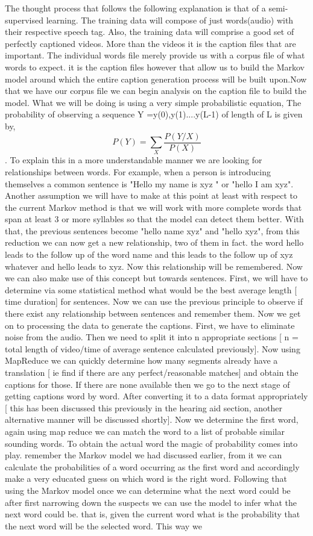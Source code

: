 \documentclass[sigconf]{acmart}
\begin{document}
The thought process that follows the following explanation is that of a semi-supervised learning. The training data will compose of just words(audio) with their respective speech tag. Also, the training data will comprise a good set of perfectly captioned videos. More than the videos it is the caption files that are important. The individual words file merely provide us with a corpus file of what words to expect. it is the caption files however that allow us to build the Markov model around which the entire caption generation process will be built upon.Now that we have our corpus file we can begin analysis on the caption file to build the model. What we will be doing is using a very simple probabilistic equation, The probability of observing a sequence Y =y(0),y(1)....y(L-1) of length of L is given by, \[ P(Y) = \sum_{X}^{} \frac{P(Y/X)}{P(X)} \] . To explain this in a more understandable manner we are looking for relationships between words. For example, when a person is introducing themselves a common sentence is "Hello my name is xyz " or "hello I am xyz". Another assumption we will have to make at this point at least with respect to the current Markov method is that we will work with more complete words that span at least 3 or more syllables so that the model can detect them better. With that, the previous sentences become "hello name xyz" and "hello xyz", from this reduction we can now get a new relationship, two of them in fact. the word hello leads to the follow up of the word name and this leads to the follow up of xyz whatever and hello leads to xyz. Now this relationship will be remembered. Now we can also make use of this concept but towards sentences. First, we will have to determine via some statistical method what would be the best average length [ time duration] for sentences. Now we can use the previous principle to observe if there exist any relationship between sentences and remember them. Now we get on to processing the data to generate the captions. First, we have to eliminate noise from the audio. Then we need to split it into n appropriate sections [ n = total length of video/time of average sentence calculated previously].  Now using MapReduce we can quickly determine how many segments already have a translation [ ie find if there are any perfect/reasonable matches] and obtain the captions for those. If there are none available then we go to the next stage of getting captions word by word. After converting it to a data format appropriately [ this has been discussed this previously in the hearing aid section, another alternative manner will be discussed shortly]. Now we determine the first word, again using map reduce we can match the word to a list of probable similar sounding words. To obtain the actual word the magic of probability comes into play. remember the Markov model we had discussed earlier, from it we can calculate the probabilities of a word occurring as the first word and accordingly make a very educated guess on which word is the right word. Following that using the Markov model once we can determine what the next word could be after first narrowing down the suspects we can use the model to infer what the next word could be. that is, given the current word what is the probability that the next word will be the selected word. This way we 
\end{document}
